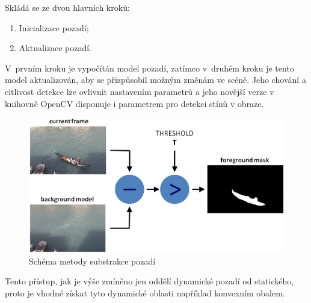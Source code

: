 Skládá se ze dvou hlavních kroků:
 \begin{enumerate}
    \item{Inicializace pozadí;}
    \item{Aktualizace pozadí.}
 \end{enumerate}
 V~prvním kroku je vypočítán model pozadí, zatímco v~druhém kroku je tento model aktualizován, aby se přizpůsobil možným změnám ve scéně. \cite{openCV:MOG}
Jeho chování a citlivost detekce lze ovlivnit nastavením parametrů a jeho novější verze v knihovně OpenCV disponuje i parametrem pro detekci stínů v obraze.
\begin{figure}[H]
  \centering
  \includegraphics[width=12cm]{figures/mog_scheme}
  \caption{Schéma metody substrakce pozadí \cite{openCV:MOG}}
  \label{mog_scheme}
\end{figure}

Tento přístup, jak je výše zmíněno jen oddělí dynamické pozadí od statického, proto je vhodné získat tyto dynamické oblasti například konvexním obalem.

